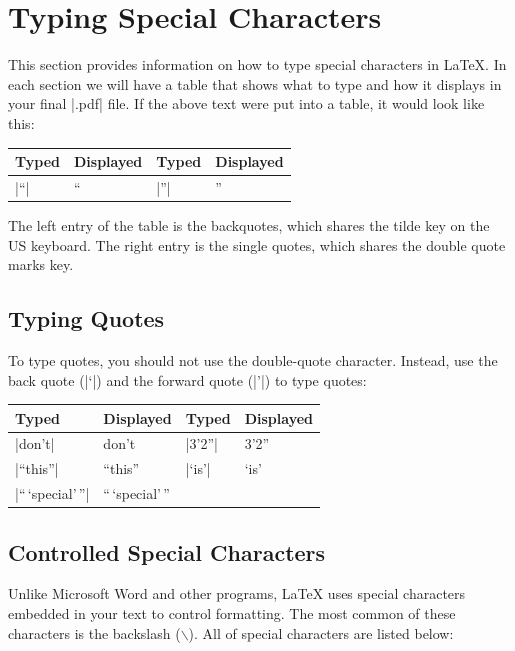 \section{Typing Special Characters}

This section provides information on how to type special characters in \LaTeX.
In each section we will have a table that shows what to type and how it
displays in your final |.pdf| file.  If the above text were put into a table,
it would look like this:

\begin{center}
\begin{tabular}{l|l||l|l}
Typed & Displayed & Typed & Displayed \\\hline
|``|  & ``        & |''|  & '' \\
\end{tabular}
\end{center}

The left entry of the table is the backquotes, which shares the tilde key on
the US keyboard.  The right entry is the single quotes, which shares the double
quote marks key.

\subsection{Typing Quotes}

To type quotes, you should not use the double-quote character. Instead, use the
back quote (|`|) and the forward quote (|'|) to type quotes:

\begin{center}
\begin{tabular}{l|l||l|l}
Typed               & Displayed & Typed   & Displayed\\\hline
|don't|             & don't     &  |3'2''|  & 3'2''\\
|``this''|          & ``this''  & |`is'|  & `is' \\
|``\,`special'\,''| & ``\,`special'\,'' \\
\end{tabular}
\end{center}


\subsection{Controlled Special Characters}\label{special}

Unlike Microsoft Word and other programs, \LaTeX{} uses special characters
embedded in your text to control formatting. The most common of these
characters is the backslash ($\backslash$). All of special characters are
listed below:

